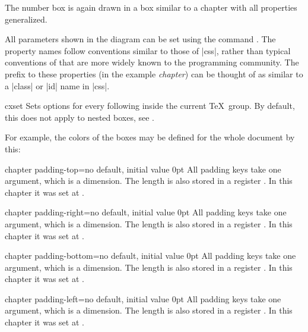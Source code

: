 The number box is again drawn in a box similar to a chapter with all properties generalized.




All parameters shown in the diagram can be set using the command . The property names follow conventions similar to those of |css|, rather than typical conventions of \tikzname that are more widely known to the programming community. The prefix to these properties (in the example \textit{chapter}) can be thought of
as similar to a |class| or |id| name in |css|.  

\begin{docCommand}{cxset}{}
  Sets options for every following  inside the current \TeX\ group.
  By default, this does not apply to nested boxes, see .\par
  For example, the colors of the boxes may be defined for the whole document by this:
\begin{dispListing}
\end{dispListing}
\end{docCommand}

\begin{docKey}[]{chapter padding-top}{=}{no default, initial value 0pt}
All padding keys take one argument, which is a dimension. The length is also stored in a register
\cmd{\chapterpaddingtop}. In this chapter it was set at \the\chapterpaddingtop.
\end{docKey}

\begin{docKey}[]{chapter padding-right}{=}{no default, initial value 0pt}
All padding keys take one argument, which is a dimension. The length is also stored in a register
\cmd{\chapterpaddingright}.  In this chapter it was set at \the\chapterpaddingright.
\end{docKey}

\begin{docKey}[]{chapter padding-bottom}{=}{no default, initial value 0pt}
All padding keys take one argument, which is a dimension. The length is also stored in a register
\cmd{\chapterpaddingbottom}.  In this chapter it was set at \the\chapterpaddingbottom.
\end{docKey}

\begin{docKey}[]{chapter padding-left}{=}{no default, initial value 0pt}
All padding keys take one argument, which is a dimension. The length is also stored in a register
\cmd{\chapterpaddingleft}.  In this chapter it was set at \the\chapterpaddingleft.
\end{docKey}

